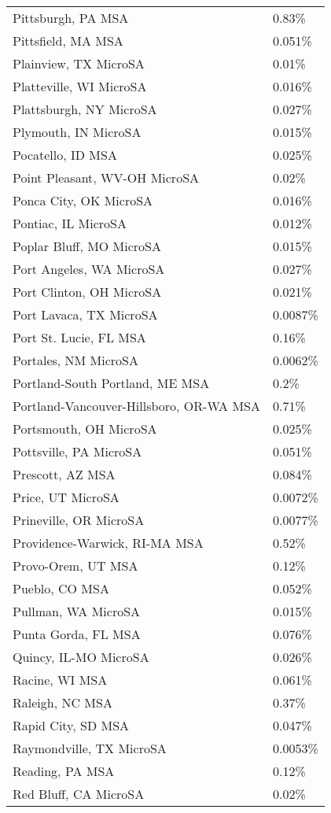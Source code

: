 \begin{longtable}[]{@{}ll@{}}
Pittsburgh, PA MSA & 0.83\% \\
Pittsfield, MA MSA & 0.051\% \\
Plainview, TX MicroSA & 0.01\% \\
Platteville, WI MicroSA & 0.016\% \\
Plattsburgh, NY MicroSA & 0.027\% \\
Plymouth, IN MicroSA & 0.015\% \\
Pocatello, ID MSA & 0.025\% \\
Point Pleasant, WV-OH MicroSA & 0.02\% \\
Ponca City, OK MicroSA & 0.016\% \\
Pontiac, IL MicroSA & 0.012\% \\
Poplar Bluff, MO MicroSA & 0.015\% \\
Port Angeles, WA MicroSA & 0.027\% \\
Port Clinton, OH MicroSA & 0.021\% \\
Port Lavaca, TX MicroSA & 0.0087\% \\
Port St. Lucie, FL MSA & 0.16\% \\
Portales, NM MicroSA & 0.0062\% \\
Portland-South Portland, ME MSA & 0.2\% \\
Portland-Vancouver-Hillsboro, OR-WA MSA & 0.71\% \\
Portsmouth, OH MicroSA & 0.025\% \\
Pottsville, PA MicroSA & 0.051\% \\
Prescott, AZ MSA & 0.084\% \\
Price, UT MicroSA & 0.0072\% \\
Prineville, OR MicroSA & 0.0077\% \\
Providence-Warwick, RI-MA MSA & 0.52\% \\
Provo-Orem, UT MSA & 0.12\% \\
Pueblo, CO MSA & 0.052\% \\
Pullman, WA MicroSA & 0.015\% \\
Punta Gorda, FL MSA & 0.076\% \\
Quincy, IL-MO MicroSA & 0.026\% \\
Racine, WI MSA & 0.061\% \\
Raleigh, NC MSA & 0.37\% \\
Rapid City, SD MSA & 0.047\% \\
Raymondville, TX MicroSA & 0.0053\% \\
Reading, PA MSA & 0.12\% \\
Red Bluff, CA MicroSA & 0.02\% \\

\end{longtable}
